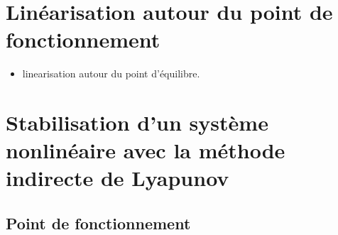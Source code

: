 \section{Linéarisation autour du point de fonctionnement}

\begin{itemize}
	\item linearisation autour du point d'équilibre.
\end{itemize}


\section{Stabilisation d'un système nonlinéaire avec la méthode indirecte de Lyapunov}
\subsection{Point de fonctionnement}